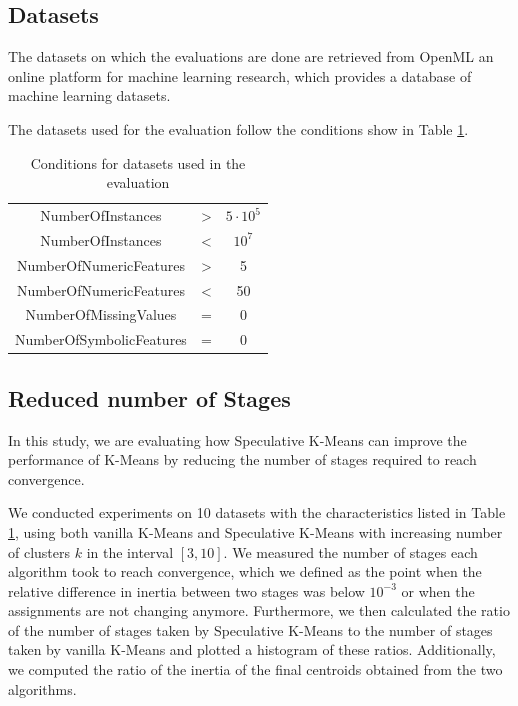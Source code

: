\subsection{Datasets}

The datasets on which the evaluations are done are retrieved from OpenML an online platform for machine learning research, which provides a database of machine learning datasets.

The datasets used for the evaluation follow the conditions show in Table \ref{table:conditions}.
\begin{table}[h]
\centering
\begin{tabular}{|c | c|  c|}
\hline
NumberOfInstances & > &  $5\cdot 10^5$\\
NumberOfInstances & < &  $10^7$ \\
NumberOfNumericFeatures & > & 5 \\
NumberOfNumericFeatures & < & 50 \\
NumberOfMissingValues & = & 0 \\
NumberOfSymbolicFeatures & = & 0 \\
\hline
\end{tabular}

\caption{Conditions for datasets used in the evaluation}
\label{table:conditions}
\end{table}

\subsection{Reduced number of Stages}
\label{section:evaluation_reduced_stages}
In this study, we are evaluating how Speculative K-Means can improve the performance of K-Means by reducing the number of stages required to reach convergence.

We conducted experiments on 10 datasets with the characteristics listed in Table \ref{table:conditions}, using both vanilla K-Means and Speculative K-Means with increasing number of clusters $k$ in the interval $[3,10]$. We measured the number of stages each algorithm took to reach convergence, which we defined as the point when the relative difference in inertia between two stages was below $10^{-3}$ or when the assignments are not changing anymore. Furthermore, we then calculated the ratio of the number of stages taken by Speculative K-Means to the number of stages taken by vanilla K-Means and plotted a histogram of these ratios. Additionally, we computed the ratio of the inertia of the final centroids obtained from the two algorithms.


